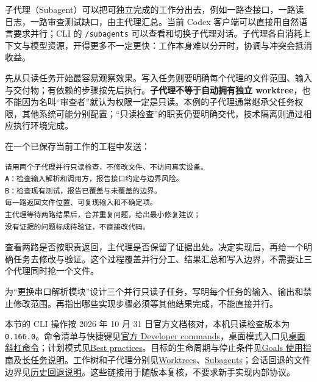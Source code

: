 子代理（Subagent）可以把可独立完成的工作分出去，例如一路查接口，一路读日志，一路审查测试缺口，由主代理汇总。当前 Codex 客户端可以直接用自然语言要求并行；CLI 的 \texttt{/subagents} 可以查看和切换子代理对话。子代理各自消耗上下文与模型资源，开得更多不一定更快：工作本身难以分开时，协调与冲突会抵消收益。

先从只读任务开始最容易观察效果。写入任务则要明确每个代理的文件范围、输入与交付物；有依赖的步骤按先后执行。\textbf{子代理不等于自动拥有独立 worktree}，也不能因为名叫“审查者”就认为权限一定是只读。本例的子代理通常继承父任务权限，其他系统可能分别配置；“只读检查”的职责仍要明确交代，技术隔离则通过相应执行环境完成。

\begin{example}
在一个已保存当前工作的工程中发送：
\begin{lstlisting}[language={}]
请用两个子代理并行只读检查，不修改文件、不访问真实设备。
A：检查输入解析和调用方，报告接口约定与边界风险。
B：检查现有测试，报告已覆盖与未覆盖的边界。
每一路返回文件位置、可复现输入和不确定项。
主代理等待两路结果后，合并重复问题，给出最小修复建议；
没有证据的问题标成待验证，不直接改代码。
\end{lstlisting}
查看两路是否按职责返回，主代理是否保留了证据出处。决定实现后，再给一个明确任务去修改与验证。这个过程覆盖并行分工、结果汇总和写入边界，不需要让三个代理同时抢一个文件。
\end{example}

\begin{exercise}\label{ex:ai-workflow-parallel}
为“更换串口解析模块”设计三个并行只读子任务，写明每个任务的输入、输出和禁止修改范围。再指出哪些实现步骤必须等其他结果完成，不能直接并行。
\end{exercise}

\begin{note}
本节的 CLI 操作按 2026 年 10 月 31 日官方文档核对，本机只读检查版本为 \texttt{0.166.0}。命令清单与快捷键见\href{https://learn.chatgpt.com/docs/developer-commands}{官方 Developer commands}，桌面模式入口见\href{https://learn.chatgpt.com/docs/reference/slash-commands}{桌面斜杠命令}；计划模式见\href{https://learn.chatgpt.com/guides/best-practices}{Best practices}。目标的生命周期与停止条件见\href{https://developers.openai.com/cookbook/examples/codex/using_goals_in_codex}{Goals 使用指南}及\href{https://learn.chatgpt.com/docs/long-running-work}{长任务说明}。工作树和子代理分别见\href{https://learn.chatgpt.com/docs/environments/git-worktrees}{Worktrees}、\href{https://learn.chatgpt.com/docs/agent-configuration/subagents}{Subagents}；会话回退的文件边界见\href{https://learn.chatgpt.com/docs/app-server\#revert-thread-history}{历史回退说明}。这些链接用于随版本复核，不要求新手实现内部协议。
\end{note}
